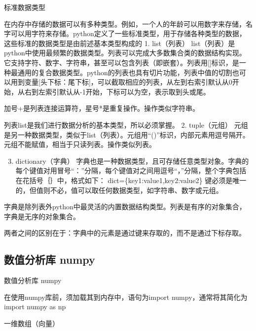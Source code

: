 \documentclass[ignorenonframetext,11pt,xcolor=dvipsnames,aspectratio=1610,hyperref={bookmarksdepth=4}]{beamer}
\providecommand{\tightlist}{%
  \setlength{\itemsep}{0pt}\setlength{\parskip}{0pt}}
\begin{document}
\begin{frame}{标准数据类型}
\protect\hypertarget{section-1}{}

在内存中存储的数据可以有多种类型。例如，一个人的年龄可以用数字来存储，名字可以用字符来存储。python定义了一些标准类型，用于存储各种类型的数据，这些标准的数据类型是由前述基本类型构成的
1. list（列表）
list（列表）是python中使用最频繁的数据类型。列表可以完成大多数集合类的数据结构实现。它支持字符、数字、字符串，甚至可以包含列表（即嵌套）。列表用{[}{]}标识，是一种最通用的复合数据类型。python的列表也具有切片功能，列表中值的切割也可以用到变量{[}头下标：尾下标{]}，可以截取相应的列表，从左到右索引默认从0开始，从右到左索引默认从-1开始，下标可以为空，表示取到头或尾。

加号+是列表连接运算符，星号*是重复操作。操作类似字符串。

列表list是我们进行数据分析的基本类型，所以必须掌握。 2. tuple（元组）
元组是另一种数据类型，类似于list（列表）。元组用``()''标识，内部元素用逗号隔开。元组不能赋值，相当于只读列表。操作类似列表。

\begin{enumerate}
\setcounter{enumi}{2}
\tightlist
\item
  dictionary（字典）
  字典也是一种数据类型，且可存储任意类型对象。字典的每个键值对用冒号``：''分隔，每个键值对之间用逗号``，''分隔，整个字典包括在花括号｛｝中，格式如下：
  dict=\{key1:value1,key2:value2\}
  键必须是唯一的，但值则不必，值可以取任何数据类型，如字符串、数字或元组。
\end{enumerate}

字典是除列表外python中最灵活的内置数据结构类型。列表是有序的对象集合，字典是无序的对象集合。

两者之间的区别在于：字典中的元素是通过键来存取的，而不是通过下标存取。

\end{frame}

\hypertarget{numpy}{%
\subsection{数值分析库 numpy}\label{numpy}}

\begin{frame}{数值分析库 numpy}

在使用numpy库前，须加载其到内存中，语句为import numpy，通常将其简化为
import numpy as np

\end{frame}

\begin{frame}{一维数组（向量）}
\protect\hypertarget{section-2}{}

\end{frame}
\end{document}
